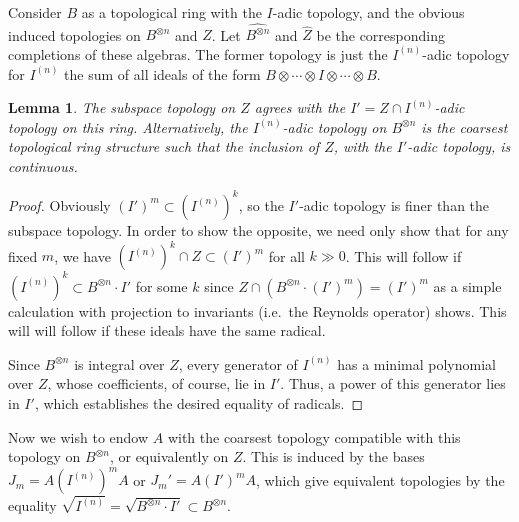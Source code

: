 \documentclass[10pt]{article}
\newtheorem{lemma}[theorem]{Lemma}
\theoremstyle{definition}
\providecommand{\ie}{i.e.\ }
\begin{document}
Consider $B$ as a
topological ring with the $I$-adic topology, and the obvious induced
topologies on $B^{\otimes n}$ and $Z$. Let $\widehat{B^{\otimes n}}$
and $\widehat{Z}$ be the corresponding completions of these algebras.
The former topology is just
the $I^{(n)}$-adic topology for $I^{(n)}$ the sum of all ideals of the
form $B\otimes \cdots \otimes I\otimes \cdots \otimes B$.
\begin{lemma}
 The subspace topology on $Z$ agrees with the 
 $I'=Z\cap I^{(n)}$-adic topology on this ring. Alternatively, the
 $I^{(n)}$-adic topology on $B^{\otimes n}$ is the coarsest
 topological ring structure
 such that the inclusion of $Z$, with the $I'$-adic topology, is continuous.
\end{lemma}
\begin{proof}
 Obviously $ (I')^m\subset (I^{(n)})^k$, so the $I'$-adic topology is
 finer than the subspace topology. In order to show the opposite, we need only show that for any fixed $m$, we have
 $(I^{(n)})^k\cap Z\subset (I')^m$ for all $k\gg 0$. This will
 follow if $(I^{(n)})^k\subset B^{\otimes n}\cdot I'$ for some $k$
 since $Z\cap(B^{\otimes n}\cdot (I')^m)=(I')^m$ as a simple
 calculation with projection to invariants (\ie the Reynolds
 operator) shows. This will
 will follow if these ideals have the same radical.

 Since $B^{\otimes n}$ is integral over $Z$, every generator of $
 I^{(n)}$ has a minimal polynomial over $Z$, whose coefficients, of
 course, lie in $I'$. Thus, a power of this generator lies in $I'$,
 which establishes the desired equality of radicals. 
\end{proof}
 Now we wish to endow $A$ with the coarsest topology compatible with
 this topology on $B^{\otimes n}$, or equivalently on $Z$. This is induced by the bases $J_m=A (I^{(n)})^m
 A$ or $J_m'=A (I')^mA$, which give equivalent topologies by the
 equality $\sqrt{I^{(n)}}=\sqrt{B^{\otimes n}\cdot I'}\subset
 B^{\otimes n}$.
\end{document}
